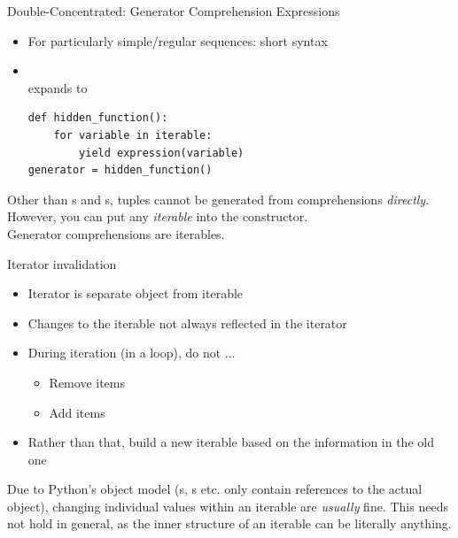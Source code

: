 
\begin{frame}[fragile]{Double-Concentrated: Generator Comprehension Expressions}
%
\begin{itemize}
\item For particularly simple/regular sequences: short syntax
\item {}\\
	expands to
\begin{codebox}[]
\begin{verbatim}
def hidden_function():
    for variable in iterable:
        yield expression(variable)
generator = hidden_function()
\end{verbatim}
\end{codebox}
\end{itemize}
%
\begin{hintbox}
\small
Other than s and s, tuples cannot be generated from comprehensions \emph{directly}. However, you can put any \emph{iterable} into the  constructor.\\
Generator comprehensions are iterables.\\
\Thus {}
\end{hintbox}
%
\end{frame}


\begin{frame}[fragile]{Iterator invalidation}
%
\begin{itemize}
\item Iterator is separate object from iterable
\item[\Thus] Changes to the iterable not always reflected in the iterator
\item[\Thus] During iteration (\ie in a  loop), do not ...
	\begin{itemize}
	\item Remove items
	\item Add items
	\end{itemize}
\item Rather than that, build a new iterable based on the information in the old one
\end{itemize}
%
\begin{hintbox}
\footnotesize
Due to Python's object model (s, s etc. only contain references to the actual object), changing individual values within an iterable are \emph{usually} fine. This needs not hold in general, as the inner structure of an iterable can be literally anything.
\end{hintbox}
%
\end{frame}

